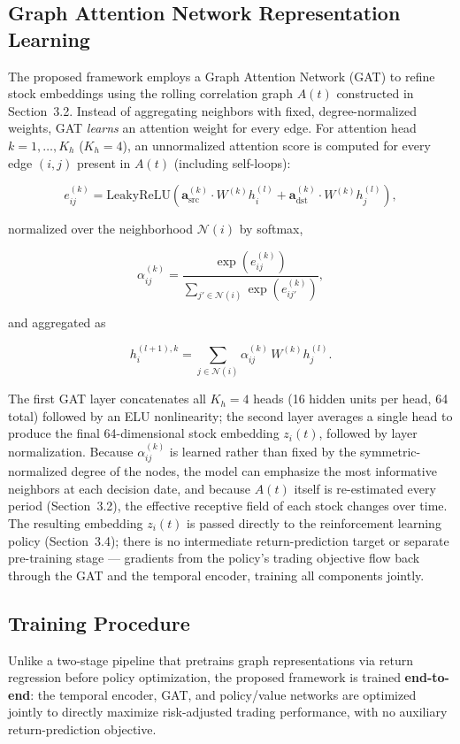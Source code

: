 \documentclass[runningheads]{llncs}
\begin{document}
\subsection{Graph Attention Network Representation Learning}

The proposed framework employs a Graph Attention Network (GAT) to refine stock embeddings using the rolling correlation graph $A(t)$ constructed in Section~3.2. Instead of aggregating neighbors with fixed, degree-normalized weights, GAT \emph{learns} an attention weight for every edge. For attention head $k=1,\dots,K_h$ ($K_h=4$), an unnormalized attention score is computed for every edge $(i,j)$ present in $A(t)$ (including self-loops):

\[
e_{ij}^{(k)}
=
\mathrm{LeakyReLU}\!\left(
\mathbf{a}^{(k)}_{\mathrm{src}}\cdot W^{(k)}h_i^{(l)}
+
\mathbf{a}^{(k)}_{\mathrm{dst}}\cdot W^{(k)}h_j^{(l)}
\right),
\]

normalized over the neighborhood $\mathcal{N}(i)$ by softmax,

\[
\alpha_{ij}^{(k)}
=
\frac{\exp\!\left(e_{ij}^{(k)}\right)}{\sum_{j'\in\mathcal{N}(i)}\exp\!\left(e_{ij'}^{(k)}\right)},
\]

and aggregated as

\[
h_i^{(l+1),k}
=
\sum_{j\in\mathcal{N}(i)}
\alpha_{ij}^{(k)}\,W^{(k)}h_j^{(l)}.
\]

The first GAT layer concatenates all $K_h=4$ heads (16 hidden units per head, 64 total) followed by an ELU nonlinearity; the second layer averages a single head to produce the final 64-dimensional stock embedding $z_i(t)$, followed by layer normalization. Because $\alpha_{ij}^{(k)}$ is learned rather than fixed by the symmetric-normalized degree of the nodes, the model can emphasize the most informative neighbors at each decision date, and because $A(t)$ itself is re-estimated every period (Section~3.2), the effective receptive field of each stock changes over time. The resulting embedding $z_i(t)$ is passed directly to the reinforcement learning policy (Section~3.4); there is no intermediate return-prediction target or separate pre-training stage --- gradients from the policy's trading objective flow back through the GAT and the temporal encoder, training all components jointly.

\subsection{Training Procedure}

Unlike a two-stage pipeline that pretrains graph representations via return regression before policy optimization, the proposed framework is trained \textbf{end-to-end}: the temporal encoder, GAT, and policy/value networks are optimized jointly to directly maximize risk-adjusted trading performance, with no auxiliary return-prediction objective.
\end{document}
